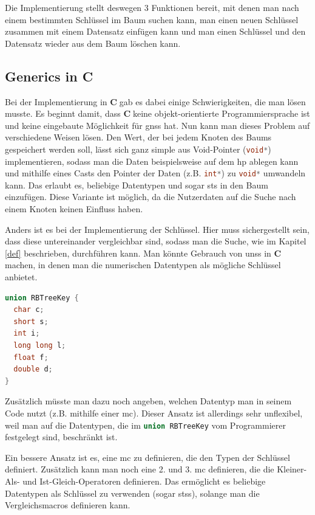 \documentclass[11pt]{article}
\newcommand{\lstin}[1]{\lstinline[language=C]{#1}}
\newcommand{\cpl}{\textbf{C}$\;$}
\begin{document}
Die Implementierung stellt deswegen 3 Funktionen bereit, mit denen man nach einem bestimmten Schlüssel im Baum suchen kann, man einen neuen Schlüssel zusammen mit einem Datensatz einfügen kann und man einen Schlüssel und den Datensatz wieder aus dem Baum löschen kann.

\subsection{Generics in C}
Bei der Implementierung in \cpl gab es dabei einige Schwierigkeiten, die man lösen musste. Es beginnt damit, dass \cpl keine objekt-orientierte Programmiersprache ist und keine eingebaute Möglichkeit für \glspl{gns} hat.
Nun kann man dieses Problem auf verschiedene Weisen lösen. Den Wert, der bei jedem Knoten des Baums gespeichert werden soll, lässt sich ganz simple aus Void-Pointer (\lstin{void*}) implementieren, sodass man die Daten beispielsweise auf dem \gls{hp} ablegen kann
und mithilfe eines Casts den Pointer der Daten (z.B. \lstin{int*}) zu \lstin{void*} umwandeln kann. Das erlaubt es, beliebige Datentypen und sogar \gls{sts} in den Baum einzufügen.
Diese Variante ist möglich, da die Nutzerdaten auf die Suche nach einem Knoten keinen Einfluss haben.

Anders ist es bei der Implementierung der Schlüssel. Hier muss sichergestellt sein, dass diese untereinander vergleichbar sind, sodass man die Suche, wie im Kapitel \ref{def} beschrieben, durchführen kann.
Man könnte Gebrauch von \glspl{uns} in \cpl machen, in denen man die numerischen Datentypen als mögliche Schlüssel anbietet.

\begin{lstlisting}[language=C]
union RBTreeKey {
  char c;
  short s;
  int i;
  long long l;
  float f;
  double d;
}
\end{lstlisting}

Zusätzlich müsste man dazu noch angeben, welchen Datentyp man in seinem Code nutzt (z.B. mithilfe einer \gls{mc}). Dieser Ansatz ist allerdings sehr unflexibel, weil man auf die Datentypen, die im \lstin{union RBTreeKey} vom Programmierer festgelegt sind, beschränkt ist.

Ein bessere Ansatz ist es, eine \gls{mc} zu definieren, die den Typen der Schlüssel definiert. Zusätzlich kann man noch eine 2. und 3. \gls{mc} definieren, die die Kleiner-Als- und Ist-Gleich-Operatoren definieren.
Das ermöglicht es beliebige Datentypen als Schlüssel zu verwenden (sogar \glspl{sts}), solange man die Vergleichsmacros definieren kann.
\end{document}
